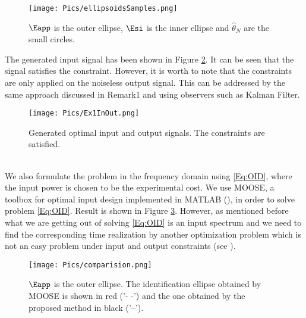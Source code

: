 \documentclass{ifacconf}
\begin{document}
\vspace{-0.1cm}
\begin{figure}[ht]
      \centering
     \texttt{[image: Pics/ellipsoidsSamples.png]}
      \caption{$\Eapp$ is the outer ellipse, $\Esi$ is the inner ellipse and $\hat{\theta}_N$ are the small circles.}
      \label{Figure:EstimatedSamples}
\end{figure}
The generated input signal has been shown in Figure \ref{Figure:OptimalInput}. It can be seen that the signal satisfies the constraint. However, it is worth to note that the constraints are only applied on the noiseless output signal. This can be addressed by the same approach discussed in Remark1 and using observers such as Kalman Filter.
\vspace{-0.1cm}
\begin{figure}[htpb]
      \centering
     \texttt{[image: Pics/Ex1InOut.png]}
      \caption{Generated optimal input and output signals. The constraints are satisfied.}
      \label{Figure:OptimalInput}
\end{figure}
\\
We also formulate the problem in the frequency domain using \eqref{Eq:OID}, where the input power is chosen to be the experimental cost. We use MOOSE, a toolbox for optimal input design implemented in MATLAB (\cite{moose}), in order to solve problem \eqref{Eq:OID}. Result is shown in Figure \ref{Figure:Comparison}. However, as mentioned before what we are getting out of solving \eqref{Eq:OID} is an input spectrum and we need to find the corresponding time realization by another optimization problem which is not an easy problem under input and output constraints (see  \cite{LarssonPer2013}).
\vspace{-0.1cm}
\begin{figure}[thpb]
      \centering
     \texttt{[image: Pics/comparision.png]}
      \caption{$\Eapp$ is the outer ellipse. The identification ellipse obtained by MOOSE is shown in red ('\textcolor{red}{- -}') and the one obtained by the proposed method in black ('\textcolor{black}{--}').} 
      \label{Figure:Comparison}
\end{figure}
\vspace{-0.2cm}
\end{document}
